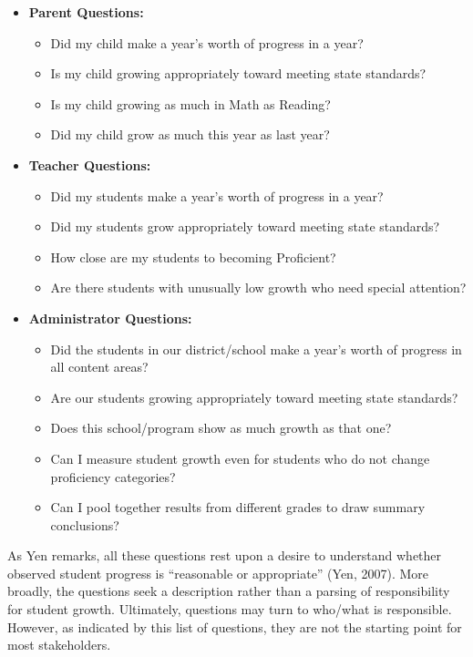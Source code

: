 \documentclass[12pt]{article}
\begin{document}
\begin{itemize}
\itemsep1pt\parskip0pt
\item
  \textbf{Parent Questions:}

  \begin{itemize}
  \itemsep1pt\parskip0pt
  \item
    Did my child make a year's worth of progress in a year?
  \item
    Is my child growing appropriately toward meeting state standards?
  \item
    Is my child growing as much in Math as Reading?
  \item
    Did my child grow as much this year as last year?
  \end{itemize}
\item
  \textbf{Teacher Questions:}

  \begin{itemize}
  \itemsep1pt\parskip0pt
  \item
    Did my students make a year's worth of progress in a year?
  \item
    Did my students grow appropriately toward meeting state standards?
  \item
    How close are my students to becoming Proficient?
  \item
    Are there students with unusually low growth who need special
    attention?
  \end{itemize}
\item
  \textbf{Administrator Questions:}

  \begin{itemize}
  \itemsep1pt\parskip0pt
  \item
    Did the students in our district/school make a year's worth of
    progress in all content areas?
  \item
    Are our students growing appropriately toward meeting state
    standards?
  \item
    Does this school/program show as much growth as that one?
  \item
    Can I measure student growth even for students who do not change
    proficiency categories?
  \item
    Can I pool together results from different grades to draw summary
    conclusions?
  \end{itemize}
\end{itemize}

As Yen remarks, all these questions rest upon a desire to understand
whether observed student progress is ``reasonable or appropriate'' (Yen,
2007). More broadly, the questions seek a description rather than a
parsing of responsibility for student growth. Ultimately, questions may
turn to who/what is responsible. However, as indicated by this list of
questions, they are not the starting point for most stakeholders.
\end{document}
